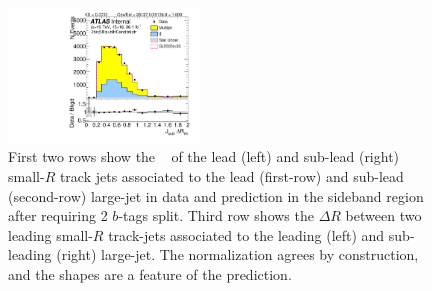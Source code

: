 \begin{figure}[htbp!]
\begin{center}
\includegraphics[width=0.45\textwidth,angle=-90]{figures/boosted/Sideband/b77_TwoTag_split_Sideband_sublHCand_trk_dr.pdf}
  \caption{First two rows show the \pt~ of the lead (left) and sub-lead (right) small-$R$ track jets associated to the lead (first-row) and sub-lead (second-row) large-\R jet in data and prediction in the sideband region after requiring 2 $b$-tags split. Third row shows the $\Delta R$ between two leading small-$R$ track-jets associated to the leading (left) and sub-leading (right) large-\R jet. The normalization agrees by construction, and the shapes are a feature of the prediction. }
  \label{fig:boosted-2bs-sideband-ak2}
\end{center}
\end{figure}


